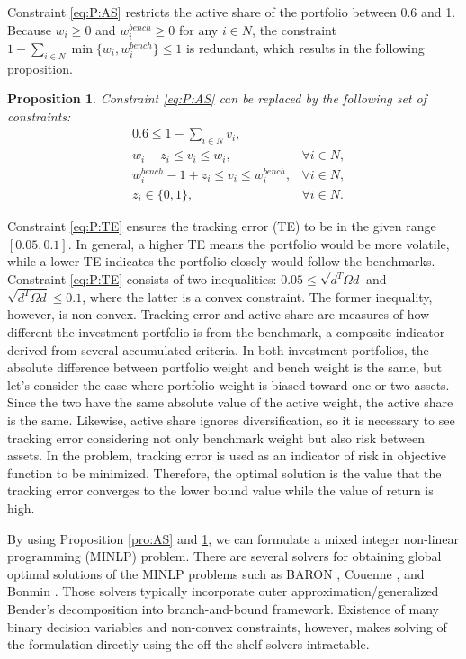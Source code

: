 \documentclass[11pt]{article}
\newtheorem{pro}{Proposition}
\begin{document}
	Constraint \eqref{eq:P:AS} restricts the active share of the portfolio between 0.6 and 1. Because $w_i \ge 0$ and $w^{bench}_i \ge 0$ for any $i \in N$, the constraint $1 - \sum_{i \in N} \min\{w_i, w^{bench}_i \} \le 1$ is redundant, which results in the following proposition.
	\begin{pro}\label{pro:TE}
		Constraint \eqref{eq:P:AS} can be replaced by the following set of constraints:
		\begin{align*}
		& 0.6 \le 1 -  \sum_{i \in N} v_i,\\
		& w_i - z_i \le v_i \le w_i, & \forall i \in N,\\
		& w^{bench}_i - 1 + z_i \le v_i \le w^{bench}_i, & \forall i \in N,\\
		& z_i \in \{0,1\}, & \forall i \in N.
		\end{align*}
	\end{pro}
	
	Constraint \eqref{eq:P:TE} ensures the tracking error (TE) to be in the given range $[0.05,0.1]$. In general, a higher TE means the portfolio would be more volatile, while a lower TE indicates the portfolio closely would follow the benchmarks. Constraint \eqref{eq:P:TE} consists of two inequalities: $0.05 \le \sqrt{d^T \Omega d}$ and $\sqrt{d^T \Omega d} \le 0.1$, where the latter is a convex constraint. The former inequality, however, is non-convex. Tracking error and active share are measures of how different the investment portfolio is from the benchmark, a composite indicator derived from several accumulated criteria. In both investment portfolios, the absolute difference between portfolio weight and bench weight is the same, but let's consider the case where portfolio weight is biased toward one or two assets. Since the two have the same absolute value of the active weight, the active share is the same. Likewise, active share ignores diversification, so it is necessary to see tracking error considering not only benchmark weight but also risk between assets. In the problem, tracking error is used as an indicator of risk in objective function to be minimized. Therefore, the optimal solution is the value that the tracking error converges to the lower bound value while the value of return is high.
	
	By using Proposition \ref{pro:AS} and \ref{pro:TE}, we can formulate a mixed integer non-linear programming (MINLP) problem. There are several solvers for obtaining global optimal solutions of the MINLP problems such as BARON \citep{sahinidis:baron:17.8.9}, Couenne \citep{coin}, and Bonmin \citep{BONAMI2008186}. Those solvers typically incorporate outer approximation/generalized Bender's decomposition into branch-and-bound framework. Existence of many binary decision variables and non-convex constraints, however, makes solving of the formulation directly using the off-the-shelf solvers intractable. 
	
\end{document}
